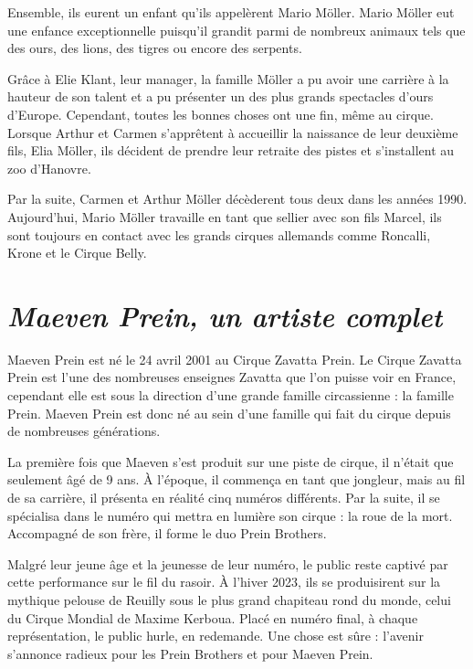 Ensemble, ils eurent un enfant qu’ils appelèrent Mario Möller. Mario Möller eut une enfance exceptionnelle puisqu’il grandit parmi de nombreux animaux tels que des ours, des lions, des tigres ou encore des serpents.

Grâce à Elie Klant, leur manager, la famille Möller a pu avoir une carrière à la hauteur de son talent et a pu présenter un des plus grands spectacles d’ours d’Europe. Cependant, toutes les bonnes choses ont une fin, même au cirque. Lorsque Arthur et Carmen s’apprêtent à accueillir la naissance de leur deuxième fils, Elia Möller, ils décident de prendre leur retraite des pistes et s’installent au zoo d'Hanovre.

Par la suite, Carmen et Arthur Möller décèderent tous deux dans les années 1990. Aujourd'hui, Mario Möller travaille en tant que sellier avec son fils Marcel, ils sont toujours en contact avec les grands cirques allemands comme Roncalli, Krone et le Cirque Belly.

\section*{\textit{Maeven Prein, un artiste complet}}
{}
\noindent
Maeven Prein est né le 24 avril 2001 au Cirque Zavatta Prein. Le Cirque Zavatta Prein est l’une des nombreuses enseignes Zavatta que l’on puisse voir en France, cependant elle est sous la direction d’une grande famille circassienne : la famille Prein. Maeven Prein est donc né au sein d’une famille qui fait du cirque depuis de nombreuses générations.

La première fois que Maeven s'est produit sur une piste de cirque, il n’était que seulement âgé de 9 ans. À l’époque, il commença en tant que jongleur, mais au fil de sa carrière, il présenta en réalité cinq numéros différents. Par la suite, il se spécialisa dans le numéro qui mettra en lumière son cirque : la roue de la mort. Accompagné de son frère, il forme le duo Prein Brothers.

Malgré leur jeune âge et la jeunesse de leur numéro, le public reste captivé par cette performance sur le fil du rasoir. À l’hiver 2023, ils se produisirent sur la mythique pelouse de Reuilly sous le plus grand chapiteau rond du monde, celui du Cirque Mondial de Maxime Kerboua. Placé en numéro final, à chaque représentation, le public hurle, en redemande. Une chose est sûre : l’avenir s’annonce radieux pour les Prein Brothers et pour Maeven Prein.

